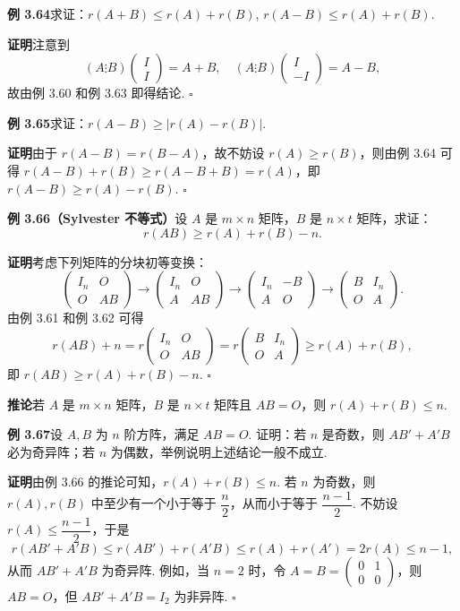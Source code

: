 \documentclass[UTF8,12pt,a4paper,fontset=fandol]{ctexart}
\begin{document}
\noindent\textbf{例 3.64}\quad 求证：$r(A+B)\le r(A)+r(B)$, $r(A-B)\le r(A)+r(B)$.

\noindent\textbf{证明}\quad 注意到
\[
(A\vdots B)\begin{pmatrix}I\\I\end{pmatrix}=A+B,\quad
(A\vdots B)\begin{pmatrix}I\\-I\end{pmatrix}=A-B,
\]
故由例 3.60 和例 3.63 即得结论. $\square$

\noindent\textbf{例 3.65}\quad 求证：$r(A-B)\ge |r(A)-r(B)|$.

\noindent\textbf{证明}\quad 由于 $r(A-B)=r(B-A)$，故不妨设 $r(A)\ge r(B)$，则由例 3.64 可得 $r(A-B)+r(B)\ge r(A-B+B)=r(A)$，即 $r(A-B)\ge r(A)-r(B)$. $\square$

\noindent\textbf{例 3.66（Sylvester 不等式）}\quad 设 $A$ 是 $m\times n$ 矩阵，$B$ 是 $n\times t$ 矩阵，求证：
\[
r(AB)\ge r(A)+r(B)-n.
\]

\noindent\textbf{证明}\quad 考虑下列矩阵的分块初等变换：
\[
\begin{pmatrix}I_n&O\\O&AB\end{pmatrix}
\to
\begin{pmatrix}I_n&O\\A&AB\end{pmatrix}
\to
\begin{pmatrix}I_n&-B\\A&O\end{pmatrix}
\to
\begin{pmatrix}B&I_n\\O&A\end{pmatrix}.
\]
由例 3.61 和例 3.62 可得
\[
r(AB)+n=r\begin{pmatrix}I_n&O\\O&AB\end{pmatrix}
=r\begin{pmatrix}B&I_n\\O&A\end{pmatrix}\ge r(A)+r(B),
\]
即 $r(AB)\ge r(A)+r(B)-n$. $\square$

\noindent\textbf{推论}\quad 若 $A$ 是 $m\times n$ 矩阵，$B$ 是 $n\times t$ 矩阵且 $AB=O$，则 $r(A)+r(B)\le n$.

\noindent\textbf{例 3.67}\quad 设 $A,B$ 为 $n$ 阶方阵，满足 $AB=O$. 证明：若 $n$ 是奇数，则 $AB'+A'B$ 必为奇异阵；若 $n$ 为偶数，举例说明上述结论一般不成立.

\noindent\textbf{证明}\quad 由例 3.66 的推论可知，$r(A)+r(B)\le n$. 若 $n$ 为奇数，则 $r(A),r(B)$ 中至少有一个小于等于 $\dfrac{n}{2}$，从而小于等于 $\dfrac{n-1}{2}$. 不妨设 $r(A)\le\dfrac{n-1}{2}$，于是
\[
r(AB'+A'B)\le r(AB')+r(A'B)\le r(A)+r(A')=2r(A)\le n-1,
\]
从而 $AB'+A'B$ 为奇异阵. 例如，当 $n=2$ 时，令 $A=B=\begin{pmatrix}0&1\\0&0\end{pmatrix}$，则 $AB=O$，但 $AB'+A'B=I_2$ 为非异阵. $\square$
\end{document}
